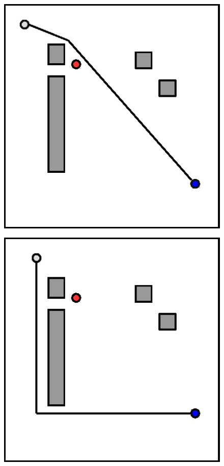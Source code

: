 \documentclass[a4paper, twocolumn]{article}
\begin{document}
\begin{minipage}{\linewidth}        	
        \centering
	\begin{minipage}{0.4\linewidth}
	\begin{figure}[H]
		\includegraphics[width=\linewidth]{share/bad.eps}
		\caption{}
		\label{fig:optimal_path}
        \end{figure}
	\end{minipage}
	\hspace{0.05\linewidth}
	\begin{minipage}{0.4\linewidth}
	\begin{figure}[H]
		\includegraphics[width=\linewidth]{share/good.eps}

\end{figure}
\end{minipage}
\end{minipage}
\end{document}
